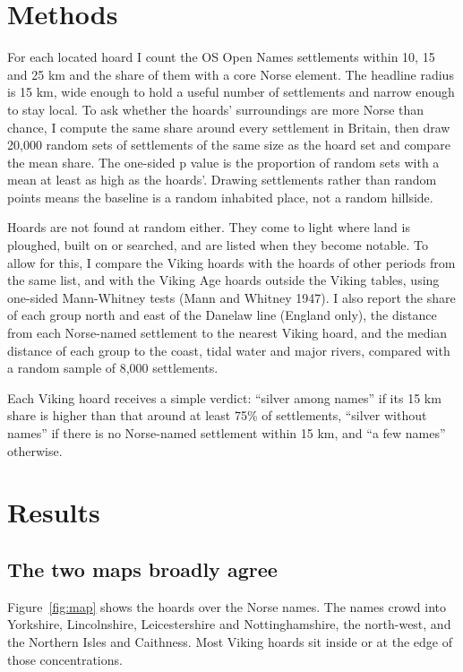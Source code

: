 \documentclass[11pt,a4paper]{article}
\begin{document}
\section{Methods}

For each located hoard I count the OS Open Names settlements within 10, 15 and 25 km and the share of them with a core Norse element. The headline radius is 15 km, wide enough to hold a useful number of settlements and narrow enough to stay local. To ask whether the hoards' surroundings are more Norse than chance, I compute the same share around every settlement in Britain, then draw 20,000 random sets of settlements of the same size as the hoard set and compare the mean share. The one-sided p value is the proportion of random sets with a mean at least as high as the hoards'. Drawing settlements rather than random points means the baseline is a random inhabited place, not a random hillside.

Hoards are not found at random either. They come to light where land is ploughed, built on or searched, and are listed when they become notable. To allow for this, I compare the Viking hoards with the hoards of other periods from the same list, and with the Viking Age hoards outside the Viking tables, using one-sided Mann-Whitney tests (Mann and Whitney 1947). I also report the share of each group north and east of the Danelaw line (England only), the distance from each Norse-named settlement to the nearest Viking hoard, and the median distance of each group to the coast, tidal water and major rivers, compared with a random sample of 8,000 settlements.

Each Viking hoard receives a simple verdict: ``silver among names'' if its 15 km share is higher than that around at least 75\% of settlements, ``silver without names'' if there is no Norse-named settlement within 15 km, and ``a few names'' otherwise.

\section{Results}

\subsection{The two maps broadly agree}

Figure~\ref{fig:map} shows the hoards over the Norse names. The names crowd into Yorkshire, Lincolnshire, Leicestershire and Nottinghamshire, the north-west, and the Northern Isles and Caithness. Most Viking hoards sit inside or at the edge of those concentrations.
\end{document}
